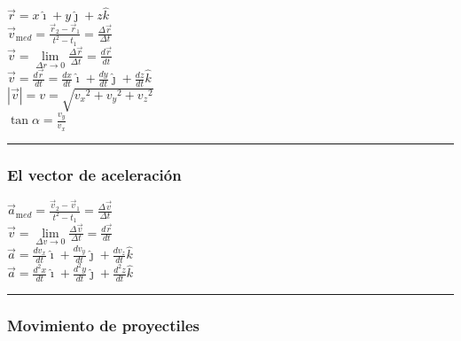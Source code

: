 \documentclass[
]{article}
\begin{document}
{\(\overset{\rightarrow}{r} = x\hat{\imath} + y\hat{\jmath} + z\hat{k}\)}\\
{\({\overset{\rightarrow}{v}}_{\text{m}ed} = \frac{{\overset{\rightarrow}{r}}_{2} - {\overset{\rightarrow}{r}}_{1}}{t^{2} - t_{1}} = \frac{\Delta\overset{\rightarrow}{r}}{\Delta t}\)}\\
{\(\overset{\rightarrow}{v} = \lim\limits_{\Delta r \rightarrow 0}\frac{\Delta\overset{\rightarrow}{r}}{\Delta t} = \frac{d\overset{\rightarrow}{r}}{dt}\)}\\
{\(\overset{\rightarrow}{v} = \frac{d\overset{\rightarrow}{r}}{dt} = \frac{dx}{dt}\hat{\imath} + \frac{dy}{dt}\hat{\jmath} + \frac{dz}{dt}\hat{k}\)}\\
{\(|\overset{\rightarrow}{v}| = v = \sqrt{{v_{x}}^{2} + {v_{y}}^{2} + {v_{z}}^{2}}\)}\\
{\(\tan\alpha = \frac{v_{y}}{v_{x}}\)}

\begin{center}\rule{0.5\linewidth}{0.5pt}\end{center}

\hypertarget{el-vector-de-aceleraciuxf3n}{%
\subsubsection{El vector de
aceleración}\label{el-vector-de-aceleraciuxf3n}}

{\({\overset{\rightarrow}{a}}_{\text{m}ed} = \frac{{\overset{\rightarrow}{v}}_{2} - {\overset{\rightarrow}{v}}_{1}}{t^{2} - t_{1}} = \frac{\Delta\overset{\rightarrow}{v}}{\Delta t}\)}\\
{\(\overset{\rightarrow}{v} = \lim\limits_{\Delta v \rightarrow 0}\frac{\Delta\overset{\rightarrow}{v}}{\Delta t} = \frac{d\overset{\rightarrow}{r}}{dt}\)}\\
{\(\overset{\rightarrow}{a} = \frac{dv_{x}}{dt}\hat{\imath} + \frac{dv_{y}}{dt}\hat{\jmath} + \frac{dv_{z}}{dt}\hat{k}\)}\\
{\(\overset{\rightarrow}{a} = \frac{d^{2}x}{dt}\hat{\imath} + \frac{d^{2}y}{dt}\hat{\jmath} + \frac{d^{2}z}{dt}\hat{k}\)}

\begin{center}\rule{0.5\linewidth}{0.5pt}\end{center}

\hypertarget{movimiento-de-proyectiles}{%
\subsubsection{Movimiento de
proyectiles}\label{movimiento-de-proyectiles}}
\end{document}
